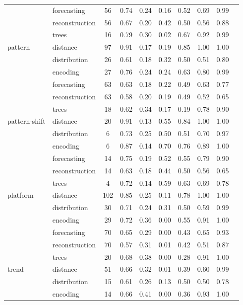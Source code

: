 \begin{tabular}{|l|l|c|c|c|c|c|c|c|c|}
 & forecasting & 56 & 0.74 & 0.24 & 0.16 & 0.52 & 0.69 & 0.99 \\
 & reconstruction & 56 & 0.67 & 0.20 & 0.42 & 0.50 & 0.56 & 0.88 \\
 & trees & 16 & 0.79 & 0.30 & 0.02 & 0.67 & 0.92 & 0.99 \\
\cline{1-9}
\multirow[t]{6}{*}{pattern} & distance & 97 & 0.91 & 0.17 & 0.19 & 0.85 & 1.00 & 1.00 \\
 & distribution & 26 & 0.61 & 0.18 & 0.32 & 0.50 & 0.51 & 0.80 \\
 & encoding & 27 & 0.76 & 0.24 & 0.24 & 0.63 & 0.80 & 0.99 \\
 & forecasting & 63 & 0.63 & 0.18 & 0.22 & 0.49 & 0.63 & 0.77 \\
 & reconstruction & 63 & 0.58 & 0.20 & 0.19 & 0.49 & 0.52 & 0.65 \\
 & trees & 18 & 0.62 & 0.34 & 0.17 & 0.19 & 0.78 & 0.90 \\
\cline{1-9}
\multirow[t]{6}{*}{pattern-shift} & distance & 20 & 0.91 & 0.13 & 0.55 & 0.84 & 1.00 & 1.00 \\
 & distribution & 6 & 0.73 & 0.25 & 0.50 & 0.51 & 0.70 & 0.97 \\
 & encoding & 6 & 0.87 & 0.14 & 0.70 & 0.76 & 0.89 & 1.00 \\
 & forecasting & 14 & 0.75 & 0.19 & 0.52 & 0.55 & 0.79 & 0.90 \\
 & reconstruction & 14 & 0.63 & 0.18 & 0.44 & 0.50 & 0.56 & 0.65 \\
 & trees & 4 & 0.72 & 0.14 & 0.59 & 0.63 & 0.69 & 0.78 \\
\cline{1-9}
\multirow[t]{6}{*}{platform} & distance & 102 & 0.85 & 0.25 & 0.11 & 0.78 & 1.00 & 1.00 \\
 & distribution & 30 & 0.71 & 0.24 & 0.31 & 0.50 & 0.59 & 0.99 \\
 & encoding & 29 & 0.72 & 0.36 & 0.00 & 0.55 & 0.91 & 1.00 \\
 & forecasting & 70 & 0.65 & 0.29 & 0.00 & 0.43 & 0.65 & 0.93 \\
 & reconstruction & 70 & 0.57 & 0.31 & 0.01 & 0.42 & 0.51 & 0.87 \\
 & trees & 20 & 0.68 & 0.38 & 0.00 & 0.28 & 0.91 & 1.00 \\
\cline{1-9}
\multirow[t]{6}{*}{trend} & distance & 51 & 0.66 & 0.32 & 0.01 & 0.39 & 0.60 & 0.99 \\
 & distribution & 15 & 0.61 & 0.26 & 0.13 & 0.50 & 0.50 & 0.78 \\
 & encoding & 14 & 0.66 & 0.41 & 0.00 & 0.36 & 0.93 & 1.00 \\

\end{tabular}
